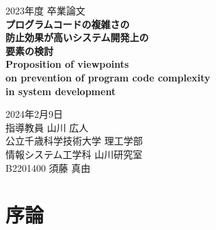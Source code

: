 \documentclass[12pt, a4paper]{jreport}
\begin{document}
    \thispagestyle{empty}
    \begin{center}

        \vspace{20mm}
        {\Large\noindent 2023年度 卒業論文}\\
        \vspace{40mm}
        {\huge\noindent\textbf{プログラムコードの複雑さの}}\\
        {\huge\noindent\textbf{防止効果が高いシステム開発上の}}\\
        {\huge\noindent\textbf{要素の検討}}\\
        \medskip
        \vspace{\baselineskip}
        {\LARGE\noindent\textbf{Proposition of viewpoints}}\\
        \medskip
        {\LARGE\noindent\textbf{on prevention of program code complexity }}\\
        \medskip
        {\LARGE\noindent\textbf{in system development}}\\
        \vspace{40mm}

        {\Large\noindent
        2024年2月9日\\
        \vspace{\baselineskip}
        指導教員 山川 広人   \\
        \vspace{\baselineskip}
        公立千歳科学技術大学 理工学部\\
        情報システム工学科 山川研究室\\
        \vspace{\baselineskip}
        B2201400 須藤 真由 \\
        }
        \vspace{40mm}

    \end{center}
    \tableofcontents
    \chapter{序論}
\end{document}
